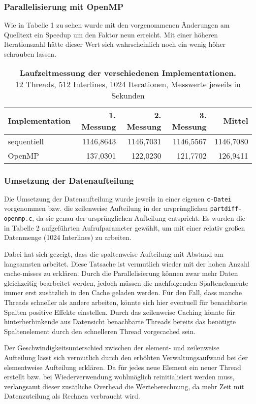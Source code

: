 \documentclass[a4paper,12pt]{scrartcl}
\begin{document}
\parindent0mm
\setcapindent{0pt}
\subsubsection*{Parallelisierung mit OpenMP}
Wie in Tabelle 1 zu sehen wurde mit den vorgenommenen Änderungen am Quelltext ein Speedup um den Faktor neun erreicht. Mit einer höheren Iterationszahl hätte dieser Wert sich wahrscheinlich noch ein wenig höher schrauben lassen.
\begin{table}[!h]
\begin{tabular}{|l|r|r|r|r|}
\hline
Implementation&1. Messung&2. Messung&3. Messung&Mittel\\
\hline
sequentiell&	1146,8643&	1146,7031&	1146,5567&	1146,7080\\
\hline
OpenMP	&137,0301	&122,0230	&121,7702&	126,9411\\
\hline
\end{tabular}
\caption{\textbf{Laufzeitmessung der verschiedenen Implementationen.}\\ 12 Threads, 512 Interlines, 1024 Iterationen, Messwerte jeweils in Sekunden}
\end{table}
\subsubsection*{Umsetzung der Datenaufteilung}
Die Umsetzung der Datenaufteilung wurde jeweils in einer eigenen \texttt{c-Datei} vorgenommen bzw. die zeilenweise Aufteilung in der ursprünglichen \texttt{partdiff-openmp.c}, da sie genau der ursprünglichen Aufteilung entspricht. Es wurden die in Tabelle 2 aufgeführten Aufrufparameter gewählt, um mit einer relativ großen Datenmenge (1024 Interlines) zu arbeiten.

Dabei hat sich gezeigt, dass die spaltenweise Aufteilung mit Abstand am langsamsten arbeitet. Diese Tatsache ist vermutlich wieder mit der hohen Anzahl cache-misses zu erklären. Durch die Parallelisierung können zwar mehr Daten gleichzeitig bearbeitet werden, jedoch müssen die nachfolgenden Spaltenelemente immer erst zusätzlich in den Cache geladen werden. Für den Fall, dass manche Threads schneller als andere arbeiten, könnte sich hier eventuell für benachbarte Spalten positive Effekte einstellen. Durch das zeilenweise Caching könnte für hinterherhinkende aus Datensicht benachbarte Threads bereits das benötigte Spaltenelement durch den schnelleren Thread vorgecached sein.

Der Geschwindigkeitsunterschied zwischen der element- und zeilenweise Aufteilung lässt sich vermutlich durch den erhöhten Verwaltungsaufwand bei der elementweise Aufteilung erklären. Da für jedes neue Element ein neuer Thread erstellt bzw. bei Wiederverwendung wohlmöglich reinitialisiert werden muss, verlangsamt dieser zusätliche Overhead die Werteberechnung, da mehr Zeit mit Datenzuteilung als Rechnen verbraucht wird. 
\end{document}
